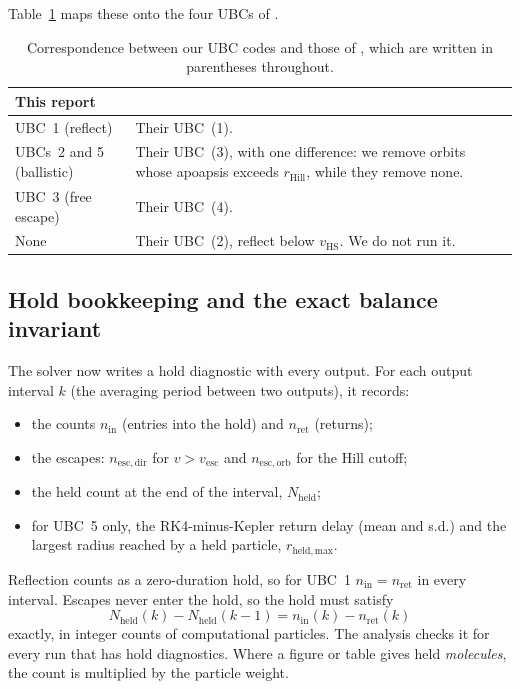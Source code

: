 \documentclass[10pt]{article}
\newcommand{\rhill}{r_\mathrm{Hill}}
\begin{document}
Table~\ref{tab:map} maps these onto the four UBCs of \citet{cm21}.

\begin{table}[h]
  \caption{Correspondence between our UBC codes and those of \citet{cm21}, which are written in parentheses throughout.}
  \label{tab:map}
  \small
  \begin{tabularx}{\textwidth}{@{}>{\raggedright\arraybackslash}p{}>{\raggedright\arraybackslash}X@{}}
  \toprule
  This report & \citet{cm21} \\
  \midrule
  UBC~1 (reflect) & Their UBC~(1). \\
  UBCs~2 and 5 (ballistic) & Their UBC~(3), with one difference: we remove orbits whose apoapsis exceeds $\rhill$, while they remove none. \\
  UBC~3 (free escape) & Their UBC~(4). \\
  None & Their UBC~(2), reflect below $v_\mathrm{HS}$. We do not run it. \\
  \bottomrule
  \end{tabularx}
\end{table}

\subsection{Hold bookkeeping and the exact balance invariant}\label{sec:bookkeeping}

The solver now writes a hold diagnostic with every output. For each output interval $k$ (the averaging period between two outputs), it records:
\begin{itemize}
  \item the counts $n_\mathrm{in}$ (entries into the hold) and $n_\mathrm{ret}$ (returns);
  \item the escapes: $n_\mathrm{esc,dir}$ for $v>v_\mathrm{esc}$ and $n_\mathrm{esc,orb}$ for the Hill cutoff;
  \item the held count at the end of the interval, $N_\mathrm{held}$;
  \item for UBC~5 only, the RK4-minus-Kepler return delay (mean and s.d.) and the largest radius reached by a held particle, $r_\mathrm{held,max}$.
\end{itemize}
Reflection counts as a zero-duration hold, so for UBC~1 $n_\mathrm{in} = n_\mathrm{ret}$ in every interval. Escapes never enter the hold, so the hold must satisfy
\[
  N_\mathrm{held}(k) - N_\mathrm{held}(k-1) = n_\mathrm{in}(k) - n_\mathrm{ret}(k)
\]
exactly, in integer counts of computational particles. The analysis checks it for every run that has hold diagnostics. Where a figure or table gives held \emph{molecules}, the count is multiplied by the particle weight.
\end{document}
